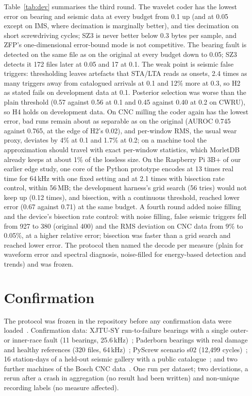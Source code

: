 \documentclass[sigconf,nonacm]{acmart}
\newcommand{\M}{MorletDB}
\begin{document}
Table~\ref{tab:dev} summarises the third round. The wavelet coder has the lowest error on bearing and seismic data at every budget from 0.1 up (and at 0.05 except on IMS, where decimation is marginally better), and ties decimation on short screwdriving cycles; SZ3 is never better below 0.3 bytes per sample, and ZFP's one-dimensional error-bound mode is not competitive. The bearing fault is detected on the same file as on the original at every budget down to 0.05; SZ3 detects it 172 files later at 0.05 and 17 at 0.1. The weak point is seismic false triggers: thresholding leaves artefacts that STA/LTA reads as onsets, 2.4 times as many triggers away from catalogued arrivals at 0.1 and 12\% more at 0.3, so H2 as stated fails on development data at 0.1. Posterior selection was worse than the plain threshold (0.57 against 0.56 at 0.1 and 0.45 against 0.40 at 0.2 on CWRU), so H4 holds on development data. On CNC milling the coder again has the lowest error, bad runs remain about as separable as on the original (AUROC 0.745 against 0.765, at the edge of H2's 0.02), and per-window RMS, the usual wear proxy, deviates by 4\% at 0.1 and 1.7\% at 0.2; on a machine tool the approximation should travel with exact per-window statistics, which \M{} already keeps at about 1\% of the lossless size. On the Raspberry Pi 3B+ of our earlier edge study, one core of the Python prototype encodes at 13 times real time for 64\,kHz with one fixed setting and at 2.1 times with bisection rate control, within 56\,MB; the development harness's grid search (56 tries) would not keep up (0.12 times), and bisection, with a continuous threshold, reached lower error (0.67 against 0.71) at the same budget. A fourth round added noise filling and the device's bisection rate control: with noise filling, false seismic triggers fell from 927 to 380 (original 400) and the RMS deviation on CNC data from 9\% to 0.05\%, at a higher relative error; bisection was faster than a grid search and reached lower error. The protocol then named the decode per measure (plain for waveform error and spectral diagnosis, noise-filled for energy-based detection and trends) and was frozen.

\section{Confirmation}\label{sec:conf}
The protocol was frozen in the repository before any confirmation data were loaded~\cite{f2}. Confirmation data: XJTU-SY run-to-failure bearings with a single outer- or inner-race fault (11 bearings, 25.6\,kHz)~\cite{wang2018xjtu}; Paderborn bearings with real damage and healthy references (320 files, 64\,kHz)~\cite{lessmeier2016}; PyScrew scenario s02 (12,499 cycles)~\cite{pyscrew}; 16 station-days of a held-out seismic gallery with a public catalogue~\cite{morletdb}; and two further machines of the Bosch CNC data~\cite{tnani2022}. One run per dataset; two deviations, a rerun after a crash in aggregation (no result had been written) and non-unique recording labels (no measure affected).
\end{document}
